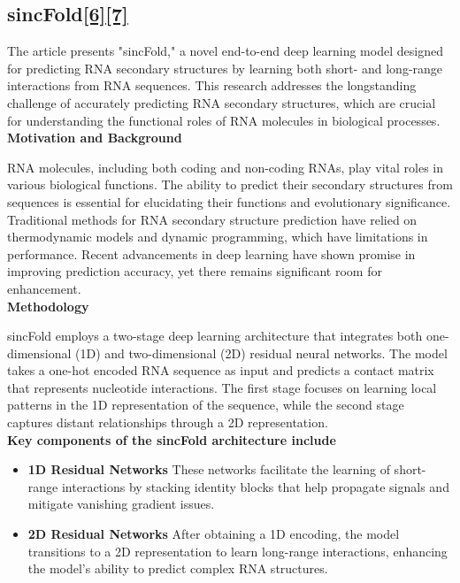 \documentclass{article}
\begin{document}
\begin{large}
\begin{large}
\begin{large}
\clearpage

\section{sincFold\href{https://pubmed.ncbi.nlm.nih.gov/38855913/}{\textbf{[6]}}\href{https://github.com/sinc-lab/sincFold}{\textbf{[7]}}}

The article presents "sincFold," a novel end-to-end deep learning model designed for predicting RNA secondary structures by learning both short- and long-range interactions from RNA sequences. This research addresses the longstanding challenge of accurately predicting RNA secondary structures, which are crucial for understanding the functional roles of RNA molecules in biological processes.\\[0.5em]

\textbf{Motivation and Background}\par

RNA molecules, including both coding and non-coding RNAs, play vital roles in various biological functions. The ability to predict their secondary structures from sequences is essential for elucidating their functions and evolutionary significance. Traditional methods for RNA secondary structure prediction have relied on thermodynamic models and dynamic programming, which have limitations in performance. Recent advancements in deep learning have shown promise in improving prediction accuracy, yet there remains significant room for enhancement.\\[0.5em]

\textbf{Methodology}\par

sincFold employs a two-stage deep learning architecture that integrates both one-dimensional (1D) and two-dimensional (2D) residual neural networks. The model takes a one-hot encoded RNA sequence as input and predicts a contact matrix that represents nucleotide interactions. The first stage focuses on learning local patterns in the 1D representation of the sequence, while the second stage captures distant relationships through a 2D representation.\\[0.5em]

\textbf{Key components of the sincFold architecture include}\par

\begin{itemize}
    \item \textbf{1D Residual Networks} 
    These networks facilitate the learning of short-range interactions by stacking identity blocks that help propagate signals and mitigate vanishing gradient issues.
    \item \textbf{2D Residual Networks} 
    After obtaining a 1D encoding, the model transitions to a 2D representation to learn long-range interactions, enhancing the model's ability to predict complex RNA structures.\\[0.5em]
\end{itemize}


\end{large}
\end{large}
\end{large}
\end{document}
